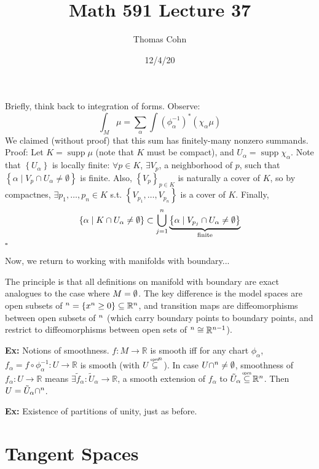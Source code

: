 \documentclass[10pt,letterpaper]{article}
\author{Thomas Cohn}
\title{Math 591 Lecture 37}
\date{12/4/20} %
\newcommand{\n}{\hfill\break}
\newcommand{\nn}{\vspace{0.5\baselineskip}\n}
\newcommand{\hangblock}[2]{\par\noindent\settowidth{\hangindent}{\textbf{#1: }}\textbf{#1: }\nolinebreak#2}
\newcommand{\ex}[1]{\hangblock{Ex}{#1}}
\newcommand{\proven}{\;$\square$\n}
\newcommand{\ptxt}[1]{\textrm{\textnormal{#1}}}
\newcommand{\set}[1]{\left\{#1\right\}}
\newcommand{\reals}{\mathbb{R}}
\newcommand{\R}{\reals}
\newcommand{\halfPlane}{\mathbb{H}}
\let\H\relax
\newcommand{\H}{\halfPlane}
\newcommand{\osubseteq}{\overset{\mathclap{\scalebox{0.5}{\ptxt{open}}}}{\subseteq}}
\let\d\relax
\newcommand{\d}{\partial}
\newcommand{\inv}{^{-1}}
\newcommand{\of}{\circ}
\DeclareMathOperator{\supp}{supp}
\newcommand{\st}{s.t.}
\begin{document}
\maketitle
\setlength\RaggedRightParindent{\parindent}
\RaggedRight

\par\noindent
Briefly, think back to integration of forms. Observe:
\[
	\int_{M}\mu=\sum_{\alpha}\int(\phi_{\alpha}\inv)^{*}(\chi_{\alpha}\mu)
\]
We claimed (without proof) that this sum has finitely-many nonzero summands.\nn
Proof: Let $K=\supp\mu$ (note that $K$ must be compact), and $U_{\alpha}=\supp\chi_{\alpha}$. Note that $\set{U_{\alpha}}$ is locally finite: $\forall{}p\in{}K$, $\exists{}V_{p}$, a neighborhood of $p$, such that $\set{\alpha\mid{}V_{p}\cap{}U_{\alpha}\ne\emptyset}$ is finite. Also, $\set{V_{p}}_{p\in{}K}$ is naturally a cover of $K$, so by compactnes, $\exists{}p_{1},\ldots,p_{n}\in{}K$ \st{} $\set{V_{p_{1}},\ldots,V_{p_{n}}}$ is a cover of $K$. Finally,
\[
	\set{\alpha\mid{}K\cap{}U_{\alpha}\ne\emptyset}\subset\bigcup_{j=1}^{n}\underbrace{\set{\alpha\mid{}V_{p_{j}}\cap{}U_{\alpha}\ne\emptyset}}_{\ptxt{finite}}
\]
\proven

\par\noindent
Now, we return to working with manifolds with boundary...\n

\par\noindent
The principle is that all definitions on manifold with boundary are exact analogues to the case where $\d{}M=\emptyset$. The key difference is the model spaces are open subsets of $\H^{n}=\set{x^{n}\ge{}0}\subseteq\R^{n}$, and transition maps are diffeomorphisms between open subsets of $\H^{n}$ (which carry boundary points to boundary points, and restrict to diffeomorphisms between open sets of $\d\H^{n}\cong\R^{n-1}$).\n

\ex{
	Notions of smoothness. $f:M\to\R$ is smooth iff for any chart $\phi_{\alpha}$, $f_{\alpha}=f\of\phi_{\alpha}\inv:U\to\R$ is smooth (with $U\osubseteq\H^{n}$). In case $U\cap\d\H^{n}\ne\emptyset$, smoothness of $f_{\alpha}:U\to\R$ means $\exists\tilde{f}_{\alpha}:\tilde{U}_{\alpha}\to\R$, a smooth extension of $f_{\alpha}$ to $\tilde{U}_{\alpha}\osubseteq\R^{n}$. Then $U=\tilde{U}_{\alpha}\cap\H^{n}$.\n
}

\ex{
	Existence of partitions of unity, just as before.\n
}

\section*{Tangent Spaces}
\end{document}
